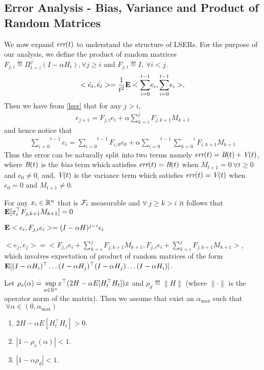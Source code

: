 \subsection{Error Analysis - Bias, Variance and Product of Random Matrices}
We now expand $\emph{err}(t)$ to understand the structure of LSERs. For the purpose of our analysis, we define the product of random matrices $F_{j,i}\eqdef\Pi_{t=i}^{j} (I-\alpha H_t), \forall j\geq i$ and $F_{j,i}\eqdef I,~\forall i<j$.
\begin{align}
<\bar{e}_t,\bar{e}_t>=\frac{1}{t^2}\mathbf{E} <\overset{t-1}{\underset{i=0}{\sum}}e_i ,\overset{t-1}{\underset{i=0}{\sum}} e_i>,
\end{align}
Then we have from \eqref{lser} that for any $j>i$,
\begin{align}
e_{j+1}=F_{j,i}e_i + \alpha\sum_{k=i}^j F_{j,k+1}M_{k+1}
\end{align} and hence notice that
\begin{align}
\overset{t-1}{\underset{i=0}{\sum}}e_i=\overset{t-1}{\underset{i=0}{\sum}} F_{i,0}e_0+\alpha \overset{t-1}{\underset{i=0}{\sum}} \overset{i}{\underset{k=0}{\sum}} F_{i,k+1}M_{k+1}\end{align} Thus the error can be naturally split into two terms namely $\emph{err}(t)=\emph{B}(t)+\emph{V}(t)$, where $\emph{B}(t)$ is the \emph{bias} term which satisfies $\emph{err}(t)=\emph{B}(t)$ when $M_{t+1}=0~\forall t\geq 0$ and $e_0\neq 0$,  and, $\emph{V}(t)$ is the variance term which satisfies $\emph{err}(t)=\emph{V}(t)$ when $e_0=0$ and $M_{t+1}\neq 0$.
\begin{lemma}
For any $x_i\in \mathbb{R}^n$ that is $\mathcal{F}_i$ measurable and $\forall ~j \geq k> i$ it follows that $\mathbf{E}[x_i^\top F_{j,k+1}M_{k+1}]=0$
\end{lemma}
\begin{lemma}
$\mathbf{E} <e_i,F_{j,i}e_i>=(I-\alpha H)^{j-i}e_i$
\end{lemma}
\begin{remark}
$<e_j,e_j>=<F_{j,i}e_i+\sum_{k=i}^j F_{j,k+1}M_{k+1},F_{j,i}e_i+\sum_{k=i}^j F_{j,k+1}M_{k+1}>$, which involves expectation of product of random matrices of the form
$
\mathbf{E}[(I-\alpha H_i)^\top\ldots (I-\alpha H_j)^\top (I-\alpha H_j)\ldots(I-\alpha H_i)]
$.
\end{remark}
\begin{assumption}
Let $\rho_{s}(\alpha)\stackrel{\cdot}{=} \underset{{x\in \mathbb{R}^n}}{\sup}x^\top (2H-\alpha E[H_t^\top H_t])x $ and $\rho_d\eqdef\parallel H \parallel$ (where $\parallel \cdot\parallel$ is the operator norm of the matrix). Then we assume that exist an $\alpha_{\max}$ such that $~\forall \alpha\in (0,\alpha_{\max})$
\begin{enumerate}[leftmargin=*]
\item $2H- \alpha E[H_t^\top H_t] >0$.
\item $|1-\rho_s(\alpha)|<1$.
\item $|1-\alpha\rho_d|<1$.
\end{enumerate}
\end{assumption}
